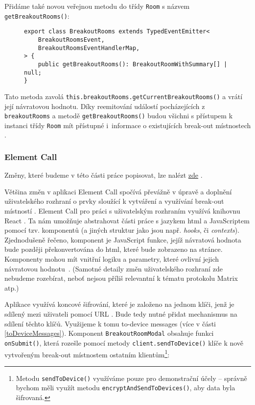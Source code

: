 Přidáme také
novou veřejnou metodu do třídy \texttt{Room} s názvem
\texttt{getBreakoutRooms()}:

\begin{figure}[H]
    \begin{verbatim}
export class BreakoutRooms extends TypedEventEmitter<
	BreakoutRoomsEvent,
	BreakoutRoomsEventHandlerMap,
> {
	public getBreakoutRooms(): BreakoutRoomWithSummary[] | null;
}
	\end{verbatim}
\end{figure}

Tato metoda zavolá
\texttt{this.breakoutRooms.getCurrentBreakoutRooms()} a vrátí
její návratovou hodnotu. Díky reemitování událostí pocházejících z
\texttt{breakoutRooms} a metodě
\texttt{getBreakoutRooms()} budou všichni s přístupem k instanci
třídy \texttt{Room} mít přístupné i~informace o existujících
break-out místnostech \parencite{GitHub-MatrixJSSDK-BreakoutRooms}.

\subsubsection{Element Call}

Změny, které budeme v této části práce popisovat, lze nalézt
\href{https://github.com/vector-im/element-call/pull/1615/}{zde}
\parencite{GitHub-ElementCall-BreakoutRooms}.

Většina změn v aplikaci Element Call spočívá převážně v úpravě a doplnění
uživatelského rozhraní o prvky sloužící k vytváření a využívání break-out
místností \parencite{GitHub-ElementCall-BreakoutRooms}. Element Call pro práci s
uživatelským rozhraním využívá knihovnu React \parencite{GitHub-ElementCall}. Ta
nám umožňuje abstrahovat části práce s jazykem \gls{html} a JavaScriptem pomocí
tzv. komponentů (a jiných struktur jako jsou např. \textit{hooks}, či
\textit{contexts}). Zjednodušeně řečeno, komponent je JavaScript funkce, jejíž
návratová hodnota bude později překonvertována do \gls{html}, které bude
zobrazeno na stránce. Komponenty mohou mít vnitřní logiku a parametry, které
ovlivní jejich návratovou hodnotu~\parencite{React-Homepage}. (Samotné detaily
změn uživatelského rozhraní zde nebudeme rozebírat, neboť nejsou příliš
relevantní k tématu protokolu Matrix atp.)

Aplikace využívá koncové šifrování, které je založeno na jednom klíči, jenž je
sdílený mezi uživateli pomocí URL
\parencite{GitHub-ElementCall-CompleteSPAE2EEWork}. Bude tedy nutné přidat
mechanismus na sdílení těchto klíčů. Využijeme k tomu to-device messages (více v
části \ref{toDeviceMessages}). Komponent
\texttt{BreakoutRoomModal} obsahuje funkci
\texttt{onSubmit()}, která rozešle pomocí metody
\texttt{client.sendToDevice()} klíče k nově vytvořeným break-out
místnostem ostatním klientům\footnote{Metodu
    \texttt{sendToDevice()} využíváme pouze pro demonstrační účely
    -- správně bychom měli využít metodu
    \texttt{encryptAndSendToDevices()}, aby data byla šifrovaná.}:

